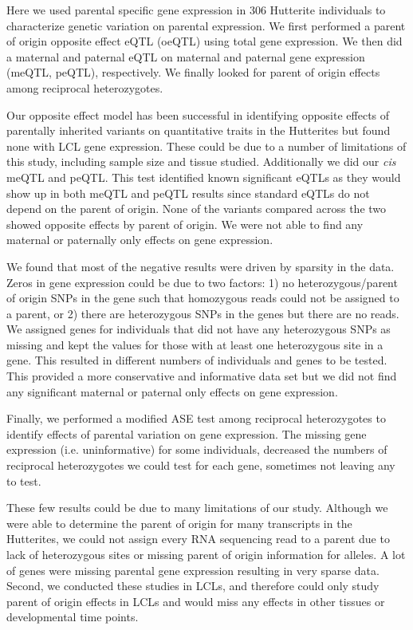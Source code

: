 Here we used parental specific gene expression in 306 Hutterite individuals to characterize genetic variation on parental expression. We first performed a parent of origin opposite effect eQTL (oeQTL) using total gene expression. We then did a maternal and paternal eQTL on maternal and paternal gene expression (meQTL, peQTL), respectively. We finally looked for parent of origin effects among reciprocal heterozygotes.

Our opposite effect model has been successful in identifying opposite effects of parentally inherited variants on quantitative traits in the Hutterites but found none with LCL gene expression. These could be due to a number of limitations of this study, including sample size and tissue studied. Additionally we did our \emph{cis} meQTL and peQTL. This test identified known significant eQTLs as they would show up in both meQTL and peQTL results since standard eQTLs do not depend on the parent of origin. None of the variants compared across the two showed opposite effects by parent of origin. We were not able to find any maternal or paternally only effects on gene expression.

We found that most of the negative results were driven by sparsity in the data. Zeros in gene expression could be due to two factors: 1) no heterozygous/parent of origin SNPs in the gene such that homozygous reads could not be assigned to a parent, or 2) there are heterozygous SNPs in the genes but there are no reads. We assigned genes for individuals that did not have any heterozygous SNPs as missing and kept the values for those with at least one heterozygous site in a gene. This resulted in different numbers of individuals and genes to be tested. This provided a more conservative and informative data set but we did not find any significant maternal or paternal only effects on gene expression.

Finally, we performed a modified ASE test among reciprocal heterozygotes to identify effects of parental variation on gene expression. The missing gene expression (i.e. uninformative) for some individuals, decreased the numbers of reciprocal heterozygotes we could test for each gene, sometimes not leaving any to test.

These few results could be due to many limitations of our study. Although we were able to determine the parent of origin for many transcripts in the Hutterites, we could not assign every RNA sequencing read to a parent due to lack of heterozygous sites or missing parent of origin information for alleles. A lot of genes were missing parental gene expression resulting in very sparse data. Second, we conducted these studies in LCLs, and therefore could only study parent of origin effects in LCLs and would miss any effects in other tissues or developmental time points. 

